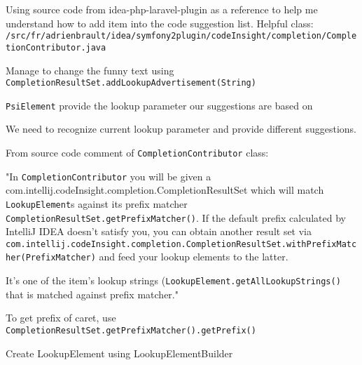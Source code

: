 \documentclass[11pt,a4paper]{article}
\begin{document}
Using source code from idea-php-laravel-plugin as a reference to help me understand how to add item into the code suggestion list. Helpful class:
\texttt{/src/fr/adrienbrault/idea/symfony2plugin/codeInsight/completion/CompletionContributor.java}

Manage to change the funny text using \texttt{CompletionResultSet.addLookupAdvertisement(String)}

\texttt{PsiElement} provide the lookup parameter our suggestions are based on

We need to recognize current lookup parameter and provide different suggestions.

From source code comment of \texttt{CompletionContributor} class:

"In \texttt{CompletionContributor} you will be given a {com.intellij.codeInsight.completion.CompletionResultSet} which will match \texttt{LookupElement}s against its prefix matcher \texttt{CompletionResultSet.getPrefixMatcher()}. If the default prefix calculated by IntelliJ IDEA doesn't satisfy you, you can obtain another result set via \texttt{com.intellij.codeInsight.completion.CompletionResultSet.withPrefixMatcher(PrefixMatcher)} and feed your lookup elements to the latter.

It's one of the item's lookup strings (\texttt{LookupElement.getAllLookupStrings()} that is matched against prefix matcher."

To get prefix of caret, use \texttt{CompletionResultSet.getPrefixMatcher().getPrefix()}

Create LookupElement using LookupElementBuilder
\end{document}
